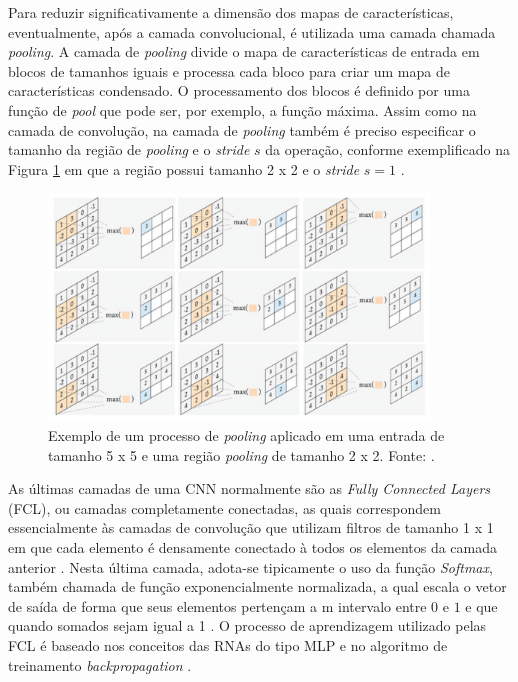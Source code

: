 Para reduzir significativamente a dimensão dos mapas de características, eventualmente, após a camada convolucional, é utilizada uma camada chamada \textit{pooling}. A camada de \textit{pooling} divide o mapa de características de entrada em blocos de tamanhos iguais e processa cada bloco para criar um mapa de características condensado. O processamento dos blocos é definido por uma função de \textit{pool} que pode ser, por exemplo, a função máxima. Assim como na camada de convolução, na camada de \textit{pooling} também é preciso especificar o tamanho da região de \textit{pooling} e o \textit{stride} $s$ da operação, conforme exemplificado na Figura \ref{img:pooling} em que a região possui tamanho 2 x 2 e o \textit{stride} $s=1$ \cite{ref:buduma,ref:khan}.

\begin{figure}[!ht]
	\centering
	\includegraphics[width=0.9\textwidth]{./img/pooling}
	\caption{Exemplo de um processo de \textit{pooling} aplicado em uma entrada de tamanho 5 x 5 e uma região \textit{pooling} de tamanho 2 x 2. Fonte: \cite{ref:khan}.}
	\label{img:pooling}
\end{figure}

As últimas camadas de uma CNN normalmente são as \textit{Fully Connected Layers} (FCL), ou camadas completamente conectadas, as quais correspondem essencialmente às camadas de convolução que utilizam filtros de tamanho 1 x 1 em que cada elemento é densamente conectado à todos os elementos da camada anterior \cite{ref:khan}. Nesta última camada, adota-se tipicamente o uso da função \textit{Softmax}, também chamada de função exponencialmente normalizada, a qual escala o vetor de saída de forma que seus elementos pertençam a m intervalo entre $0$ e $1$ e que quando somados sejam igual a 1  \cite{ref:JAI-2017}. O processo de aprendizagem utilizado pelas FCL é baseado nos conceitos das RNAs do tipo MLP e no algoritmo de treinamento \textit{backpropagation} \cite{ref:gulli, ref:khan}.

